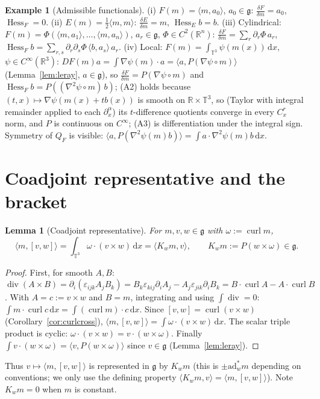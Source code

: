 \documentclass[11pt]{article}
\newtheorem{lemma}[theorem]{Lemma}
\theoremstyle{definition}
\newtheorem{example}[theorem]{Example}
\newcommand{\T}{\mathbb{T}^3}
\newcommand{\R}{\mathbb{R}}
\newcommand{\g}{\mathfrak{g}}
\newcommand{\ip}[2]{\langle #1,#2\rangle}
\newcommand{\dd}{\,\mathrm{d}x}
\newcommand{\curl}{\operatorname{curl}}
\renewcommand{\div}{\operatorname{div}}
\newcommand{\Hess}{\operatorname{Hess}}
\newcommand{\dF}[1]{\frac{\delta #1}{\delta m}}
\begin{document}
\begin{example}[Admissible functionals]\label{ex:adm}
(i) $F(m)=\ip{m}{a_0}$, $a_0\in\g$: $\dF F=a_0$, $\Hess_F=0$.
(ii) $E(m)=\tfrac12\ip mm$: $\dF E=m$, $\Hess_E b=b$.
(iii) Cylindrical: $F(m)=\Phi(\ip m{a_1},\ldots,\ip m{a_n})$, $a_r\in\g$, $\Phi\in C^2(\R^n)$:
$\dF F=\sum_r\partial_r\Phi\,a_r$, $\Hess_Fb=\sum_{r,s}\partial_r\partial_s\Phi\,\ip b{a_s}\,a_r$.
(iv) Local: $F(m)=\int_{\T}\psi(m(x))\dd$, $\psi\in C^\infty(\R^3)$:
$DF(m)a=\int\nabla\psi(m)\cdot a=\ip{a}{P(\nabla\psi\circ m)}$ (Lemma~\ref{lem:leray}, $a\in\g$), so
$\dF F=P(\nabla\psi\circ m)$ and $\Hess_Fb=P((\nabla^2\psi\circ m)\,b)$; (A2) holds because
$(t,x)\mapsto\nabla\psi(m(x)+tb(x))$ is smooth on $\R\times\T$, so (Taylor with integral remainder
applied to each $\partial_x^\alpha$) its $t$-difference quotients converge in every $C^r_x$ norm, and
$P$ is continuous on $C^\infty$; (A3) is differentiation under the integral sign. Symmetry of
$Q_F$ is visible: $\ip{a}{P(\nabla^2\psi(m)b)}=\int a\cdot\nabla^2\psi(m)b\dd$.
\end{example}

\section{Coadjoint representative and the bracket}\label{sec:bracket}
\begin{lemma}[Coadjoint representative]\label{lem:coad}
For $m,v,w\in\g$ with $\omega:=\curl m$,
\[
\ip{m}{[v,w]}=\int_{\T}\omega\cdot(v\times w)\dd=\ip{K_wm}{v},\qquad K_wm:=P(w\times\omega)\in\g .
\]
\end{lemma}
\begin{proof}
First, for smooth $A,B$: $\div(A\times B)=\partial_i(\varepsilon_{ijk}A_jB_k)=B_k\varepsilon_{kij}\partial_iA_j-A_j\varepsilon_{jik}\partial_iB_k=B\cdot\curl A-A\cdot\curl B$.
With $A=c:=v\times w$ and $B=m$, integrating and using $\int\div=0$:
$\int m\cdot\curl c\dd=\int(\curl m)\cdot c\dd$. Since $[v,w]=\curl(v\times w)$
(Corollary~\ref{cor:curlcross}), $\ip m{[v,w]}=\int\omega\cdot(v\times w)\dd$. The scalar triple product
is cyclic: $\omega\cdot(v\times w)=v\cdot(w\times\omega)$. Finally $\int v\cdot(w\times\omega)=\ip{v}{P(w\times\omega)}$
since $v\in\g$ (Lemma~\ref{lem:leray}).
\end{proof}
Thus $v\mapsto\ip m{[v,w]}$ is represented in $\g$ by $K_wm$ (this is $\pm\mathrm{ad}^*_wm$ depending
on conventions; we only use the defining property $\ip{K_wm}{v}=\ip m{[v,w]}$). Note $K_wm=0$ when
$m$ is constant.
\end{document}
